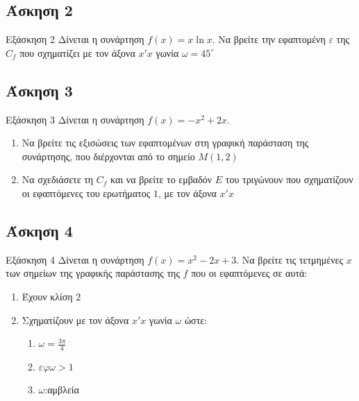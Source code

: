 \documentclass[greek]{beamer}
\begin{document}
\subsection{Άσκηση 2}
\begin{frame}[label=Άσκηση2]{Εξάσκηση 2}
  Δίνεται η συνάρτηση $f(x)=x\ln x$. Να βρείτε την εφαπτομένη $ε$ της $C_f$ που σχηματίζει με τον άξονα $x'x$ γωνία $ω=45^{\circ}$

\end{frame}

\subsection{Άσκηση 3}
\begin{frame}[label=Άσκηση3]{Εξάσκηση 3}
  Δίνεται η συνάρτηση $f(x)=-x^2+2x$.
  \begin{enumerate}
    \item<1-> Να βρείτε τις εξισώσεις των εφαπτομένων στη γραφική παράσταση της συνάρτησης, που διέρχονται από το σημείο $Μ(1,2)$
    \item<2-> Να σχεδιάσετε τη $C_f$ και να βρείτε το εμβαδόν $Ε$ του τριγώνουν που σχηματίζουν οι εφαπτόμενες του ερωτήματος $1$, με τον άξονα $x'x$
  \end{enumerate}

\end{frame}

\subsection{Άσκηση 4}
\begin{frame}[label=Άσκηση4]{Εξάσκηση 4}
  Δίνεται η συνάρτηση $f(x)=x^2-2x+3$. Να βρείτε τις τετμημένες $x$ των σημείων της γραφικής παράστασης της $f$ που οι εφαπτόμενες σε αυτά:
  \begin{enumerate}
    \item<1-> Έχουν κλίση $2$
    \item<2-> Σχηματίζουν με τον άξονα $x'x$ γωνία $ω$ ώστε:
      \begin{enumerate}
        \item<2-> $ω=\frac{3π}{4}$
        \item<3-> $εφω>1$
        \item<4-> $ω$:αμβλεία
      \end{enumerate}
  \end{enumerate}

\end{frame}
\end{document}
